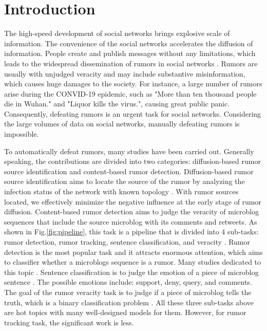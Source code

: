 \section{Introduction}
\label{sec:introduction}
The high-speed development of social networks brings explosive scale of information. The convenience of the social networks accelerates the diffusion of information. People create and publish messages without any limitations, which leads to the widespread dissemination of rumors in social networks \cite{DBLP:journals/corr/KurkaGZ15, DBLP:journals/csur/ZubiagaABLP18, DBLP:conf/sirocco/KostkaOW08, vosoughi2018spread}. Rumors are usually with unjudged veracity and may include substantive misinformation, which causes huge damages to the society. For instance, a large number of rumors arise during the CONVID-19 epidemic, such as "More than ten thousand people die in Wuhan." and "Liquor kills the virus.", causing great public panic. Consequently, defeating rumors is an urgent task for social networks. Considering the large volumes of data on social networks, manually defeating rumors is impossible. 

To automatically defeat rumors, many studies have been carried out. Generally speaking, the contributions are divided into two categories:  diffusion-based rumor source identification and content-based rumor detection. Diffusion-based rumor source identification aims to locate the source of the rumor by analyzing the infection status of the network with known topology \cite{DBLP:conf/sigmetrics/ShahZ10, DBLP:journals/tit/ShahZ11, DBLP:conf/kdd/LappasTGM10}. With rumor sources located, we effectively minimize the negative influence at the early stage of rumor diffusion. Content-based rumor detection aims to judge the veracity of microblog sequences that include the source microblog with its comments and retweets. As shown in Fig.\ref{fig:pipeline}, this task is a pipeline that is divided into 4 sub-tasks: rumor detection, rumor tracking, sentence classification, and veracity \cite{DBLP:journals/csur/ZubiagaABLP18, DBLP:conf/coling/KochkinaLZ18}. Rumor detection is the most popular task and it attracts enormous attention, which aims to classifier whether a microblogs sequence is a rumor. Many studies dedicated to this topic \cite{DBLP:conf/socinfo/ZubiagaLP17, DBLP:conf/www/Ma0W19,DBLP:conf/naacl/NguyenDCD19, DBLP:journals/corr/abs-1906-05659}. Sentence classification is to judge the emotion of a piece of microblog sentence \cite{DBLP:conf/semeval/EnayetE17, DBLP:conf/semeval/X17a, DBLP:conf/coling/ZubiagaKLPL16}. The possible emotions include: support, deny, query, and comments. The goal of the rumor veracity task is to judge if a piece of microblog tells the truth, which is a binary classification problem \cite{DBLP:conf/coling/KochkinaLZ18, DBLP:conf/acl/LiZS19, DBLP:conf/acl/KumarC19}. All these three sub-tasks above are hot topics with many well-designed models for them. However, for rumor tracking task, the significant work is less.

